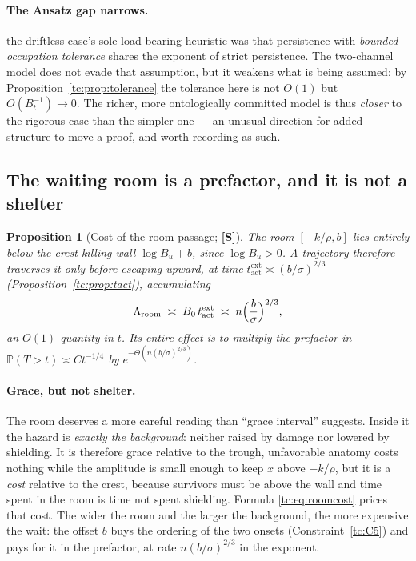 \documentclass[11pt]{article}
\numberwithin{equation}{section}
\theoremstyle{plain}
\newtheorem{proposition}[theorem]{Proposition}
\theoremstyle{definition}
\theoremstyle{remark}
\newcommand{\PP}{\mathbb{P}}
\begin{document}
\paragraph{The Ansatz gap narrows.}\label{tc:rem:gapnarrows}
the driftless case's sole load-bearing heuristic was that persistence with
\emph{bounded occupation tolerance} shares the exponent of strict
persistence. The two-channel model does not evade that assumption, but
it weakens what is being assumed: by
Proposition~\ref{tc:prop:tolerance} the tolerance here is not $O(1)$ but
$O(B_t^{-1})\to0$. The richer, more ontologically committed model is
thus \emph{closer} to the rigorous case than the simpler one --- an
unusual direction for added structure to move a proof, and worth
recording as such.

\subsection{The waiting room is a prefactor, and it is not a
shelter}\label{tc:subsub:roomcost}

\begin{proposition}[Cost of the room passage; \textbf{[S]}]
\label{tc:prop:roomcost}
The room $[-k/\rho,b]$ lies entirely below the crest killing wall
$\log B_u+b$, since $\log B_u>0$. A trajectory therefore traverses it
only before escaping upward, at time
$t^{\mathrm{ext}}_{\mathrm{act}}\asymp(b/\sigma)^{2/3}$
(Proposition~\ref{tc:prop:tact}), accumulating
\begin{equation}\label{tc:eq:roomcost}
\Lambda_{\mathrm{room}}\;\asymp\;
B_0\,t^{\mathrm{ext}}_{\mathrm{act}}
\;\asymp\;n\Bigl(\frac{b}{\sigma}\Bigr)^{2/3},
\end{equation}
an $O(1)$ quantity in $t$. Its entire effect is to multiply the
prefactor in $\PP(T>t)\asymp Ct^{-1/4}$ by
$e^{-\Theta\left(n(b/\sigma)^{2/3}\right)}$.
\end{proposition}

\paragraph{Grace, but not shelter.}\label{tc:rem:notshelter}
The room deserves a more careful reading than ``grace interval''
suggests. Inside it the hazard is \emph{exactly the background}: neither
raised by damage nor lowered by shielding. It is therefore grace
relative to the trough, unfavorable anatomy costs nothing while the
amplitude is small enough to keep $x$ above $-k/\rho$, but it is a
\emph{cost} relative to the crest, because survivors must be above the
wall and time spent in the room is time not spent shielding. Formula
\eqref{tc:eq:roomcost} prices that cost. The wider the room and the
larger the background, the more expensive the wait: the offset $b$ buys
the ordering of the two onsets (Constraint~\ref{tc:C5}) and pays for it
in the prefactor, at rate $n(b/\sigma)^{2/3}$ in the exponent.
\end{document}
